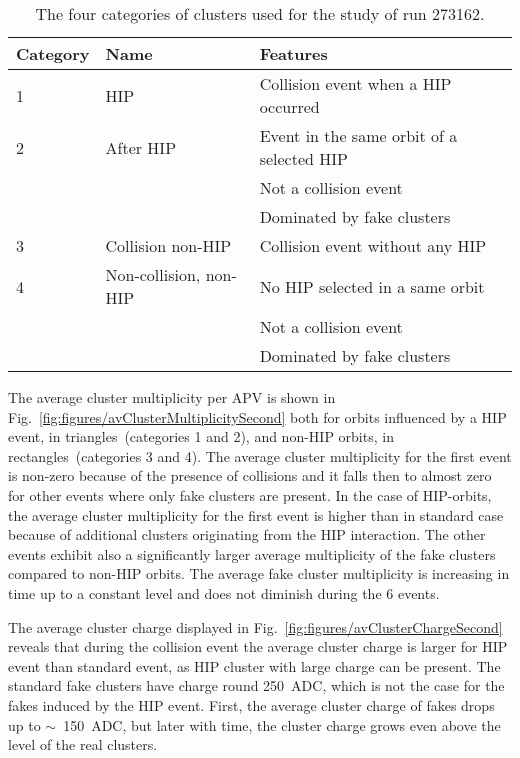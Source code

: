 \begin{table}[h]
\begin{center}
\begin{tabular}{|l|l|l|}
\hline
Category & Name  & Features \\
\hline
1 & HIP & Collision event when a HIP occurred \\
\hline
2 & After HIP & Event in the same orbit of a selected HIP \\
& & Not a collision event \\
& & Dominated by fake clusters \\
\hline
3 & Collision non-HIP & Collision event without any HIP \\
\hline
4 & Non-collision, non-HIP  & No HIP selected in a same orbit \\
& & Not a collision event \\
& & Dominated by fake clusters \\
\hline
\end{tabular}
\caption[Table caption text]{The four categories of clusters used for the study of run 273162. }
\label{tab:eventCategories}
\end{center}
\end{table}

The average cluster multiplicity per APV is shown in Fig.~\ref{fig:figures/avClusterMultiplicitySecond} both for orbits influenced by a HIP event, in triangles~(categories 1 and 2), and non-HIP orbits, in rectangles~(categories 3 and 4). The average cluster multiplicity for the first event is non-zero because of the presence of collisions and it falls then to almost zero for other events where only fake clusters are present. In the case of HIP-orbits, the average cluster multiplicity for the first event is higher than in standard case because of additional clusters originating from the HIP interaction. The other events exhibit also a significantly larger average multiplicity of the fake clusters compared to non-HIP orbits. The average fake cluster multiplicity is increasing in time up to a constant level and does not diminish during the 6 events. 

The average cluster charge displayed in Fig.~\ref{fig:figures/avClusterChargeSecond} reveals that during the collision event the average cluster charge is larger for HIP event than standard event, as HIP cluster with large charge can be present. The standard fake clusters have charge round 250~ADC, which is not the case for the fakes induced by the HIP event. First, the average cluster charge of fakes drops up to $\sim$~150~ADC, but later with time, the cluster charge grows even above the level of the real clusters. 

